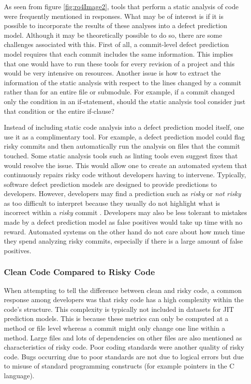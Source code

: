 \documentclass[../main.tex]{subfiles}
\begin{document}
As seen from figure \ref{fig:rq4Image2}, tools that perform a static analysis of code were frequently mentioned in responses. What may be of interest is if it is possible to incorporate the results of these analyses into a defect prediction model. Although it may be theoretically possible to do so, there are some challenges associated with this. First of all, a commit-level defect prediction model requires that each commit includes the same information. This implies that one would have to run these tools for every revision of a project and this would be very intensive on resources. Another issue is how to extract the information of the static analysis with respect to the lines changed by a commit rather than for an entire file or submodule. For example, if a commit changed only the condition in an if-statement, should the static analysis tool consider just that condition or the entire if-clause? 

Instead of including static code analysis into a defect prediction model itself, one use it as a complimentary tool. For example, a defect prediction model could flag risky commits and then automatically run the analysis on files that the commit touched. Some static analysis tools such as linting tools even suggest fixes that would resolve the issue. This would allow one to create an automated system that continuously repairs risky code without developers having to intervene. Typically, software defect prediction models are designed to provide predictions to developers. However, developers may find a prediction such as \textit{risky} or \textit{not risky} as too difficult to interpret because they usually do not highlight what is incorrect within a \textit{risky} commit \cite{nayrolles2018clever}. Developers may also be less tolerant to mistakes made by a defect prediction model as false positives would take up time with no reward. Automated systems on the other hand do not care about how much time they spend analyzing risky commits, especially if there is a large amount of false positives. 

\subsubsection{Clean Code Compared to Risky Code}

When attempting to tell the difference between clean and risky code, a common response among developers was that risky code has a high complexity within the code's structure. This complexity is typically not included in datasets for JIT prediction models. This is because these metrics can only be computed at a method or file level whereas a commit might only change one line within a method. Large files and lots of dependencies on other files are also mentioned as characteristics of risky code. Poor coding standards were another quality of risky code. Bugs occurring due to poor standards are not due to logical errors but due to misuse of standard programming constructs (for example pointers in the C language).
\end{document}
